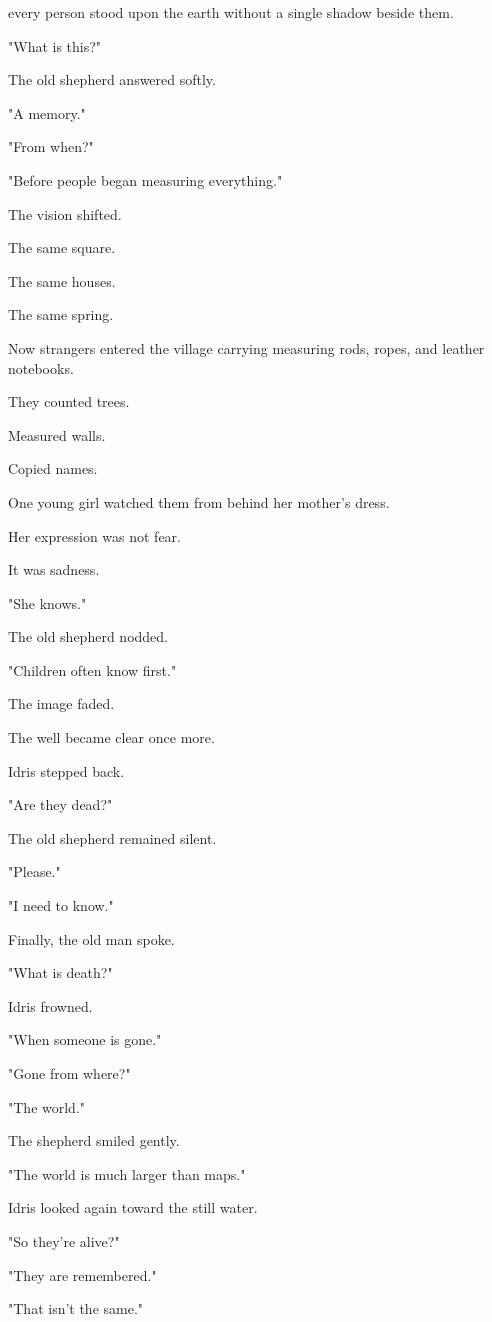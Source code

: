 \documentclass[12pt,openany]{book}
\begin{document}
every person stood upon the earth without a single shadow beside them.

"What is this?"

The old shepherd answered softly.

"A memory."

"From when?"

"Before people began measuring everything."

The vision shifted.

The same square.

The same houses.

The same spring.

Now strangers entered the village carrying measuring rods, ropes, and leather notebooks.

They counted trees.

Measured walls.

Copied names.

One young girl watched them from behind her mother's dress.

Her expression was not fear.

It was sadness.

"She knows."

The old shepherd nodded.

"Children often know first."

The image faded.

The well became clear once more.

Idris stepped back.

"Are they dead?"

The old shepherd remained silent.

"Please."

"I need to know."

Finally, the old man spoke.

"What is death?"

Idris frowned.

"When someone is gone."

"Gone from where?"

"The world."

The shepherd smiled gently.

"The world is much larger than maps."

Idris looked again toward the still water.

"So they're alive?"

"They are remembered."

"That isn't the same."
\end{document}
